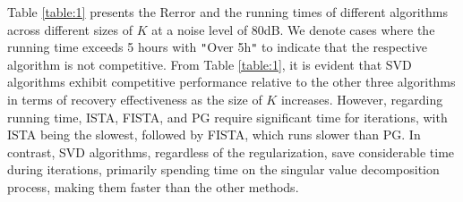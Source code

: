 \documentclass[a4paper,12pt]{article}
\numberwithin{equation}{section}
\begin{document}
\begin{table}[H]
\caption{The Rerror and running time of different algorithms with different size of $K$ when $\sigma=80$dB.}
\label{table:1}
\centering
\tabcolsep=0.35cm
\linewidth
{}
\end{table}

\par Table \ref{table:1} presents the Rerror and the running times of different algorithms across different sizes of $K$ at a noise level of $80$dB. We denote cases where the running time exceeds 5 hours with \verb+"+Over 5h\verb+"+ to indicate that the respective algorithm is not competitive. From Table \ref{table:1}, it is evident that SVD algorithms exhibit competitive performance relative to the other three algorithms in terms of recovery effectiveness as the size of $K$ increases. However, regarding running time, ISTA, FISTA, and PG require significant time for iterations, with ISTA being the slowest, followed by FISTA, which runs slower than PG. In contrast, SVD algorithms, regardless of the regularization, save considerable time during iterations, primarily spending time on the singular value decomposition process, making them faster than the other methods.
\end{document}
